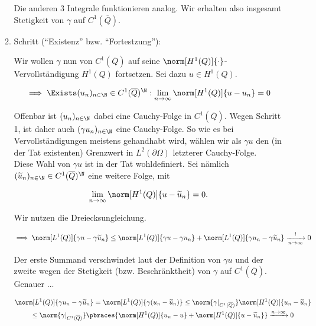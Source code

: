 \begin{solution}
\begin{enumerate}[label = \textbf{\alph*)}]
\begin{enumerate}[label = \arabic*.]
    Die anderen $3$ Integrale funktionieren analog.
    Wir erhalten also insgesamt Stetigkeit von $\gamma$ auf $C^1(\overline{Q})$.

    \item Schritt (\enquote{Existenz} bzw. \enquote{Fortestzung}):

    Wir wollen $\gamma$ nun von $C^1(\overline{Q})$ auf seine $\norm[H^1(Q)]{\cdot}$-Vervollständigung $H^1(Q)$ fortsetzen.
    Sei dazu $u \in H^1(Q)$.

    \begin{align*}
      \implies
      \Exists (u_n)_{n \in \N} \in C^1(\overline{Q})^\N:
      \lim_{n \to \infty}
      \norm[H^1(Q)]{u - u_n}
      =
      0
    \end{align*}

    Offenbar ist $(u_n)_{n \in \N}$ dabei eine Cauchy-Folge in $C^1(\overline{Q})$.
    Wegen Schritt 1, ist daher auch $(\gamma u_n)_{n \in \N}$ eine Cauchy-Folge.
    So wie es bei Vervollständigungen meistens gehandhabt wird, wählen wir als $\gamma u$ den
    (in der Tat existenten) Grenzwert in $L^2(\partial \Omega)$ letzterer Cauchy-Folge. \\

    Diese Wahl von $\gamma u$ ist in der Tat wohldefiniert.
    Sei nämlich $(\widetilde{u}_n)_{n \in \N} \in C^1(\overline{Q})^\N$ eine weitere Folge, mit

    \begin{align*}
      \lim_{n \to \infty}
      \norm[H^1(Q)]{u - \widetilde{u}_n}
      =
      0.
    \end{align*}

    Wir nutzen die Dreiecksungleichung.

    \begin{align*}
      \implies
      \norm[L^1(Q)]{\gamma u - \gamma \widetilde{u}_n}
      \leq
      \norm[L^1(Q)]{\gamma u - \gamma u_n}
      +
      \norm[L^1(Q)]{\gamma u_n - \gamma \widetilde{u}_n}
      \xrightarrow[n \to \infty]{!}
      0
    \end{align*}

    Der erste Summand verschwindet laut der Definition von $\gamma u$ und der zweite wegen der Stetigkeit (bzw. Beschränktheit) von $\gamma$ auf $C^1(\overline{Q})$.
    Genauer ...

    \begin{multline*}
      \norm[L^1(Q)]{\gamma u_n - \gamma \widetilde{u}_n}
      =
      \norm[L^1(Q)]{\gamma (u_n - \widetilde{u}_n)}
      \leq
      \norm{\gamma|_{C^1(\overline{Q})}}
      \norm[H^1(Q)]{u_n - \widetilde{u}_n} \\
      \leq
      \norm{\gamma|_{C^1(\overline{Q})}}
      \pbraces
      {
        \norm[H^1(Q)]{u_n - u}
        +
        \norm[H^1(Q)]{u - \widetilde{u}_n}
      }
      \xrightarrow[]{n \to \infty}
      0
    \end{multline*}


\end{enumerate}
\end{enumerate}
\end{solution}
